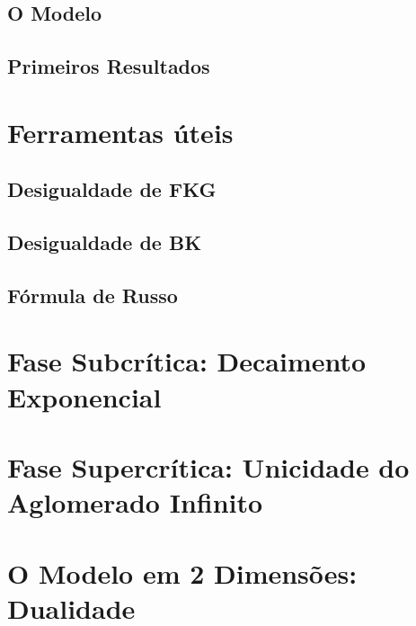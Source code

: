 \documentclass[12pt,a4paper]{book}
\begin{document}
\section{O Modelo}
\setcounter{equation}{0}
\label{sec:mod}


\section{Primeiros Resultados}
\setcounter{equation}{0}
\label{sec:res}


\chapter{Ferramentas úteis}
\setcounter{equation}{0}
\label{chp:fer}


\section{Desigualdade de FKG}
\setcounter{equation}{0}
\label{sec:fkg}


\section{Desigualdade de BK}
\setcounter{equation}{0}
\label{sec:bk}


\section{Fórmula de Russo}
\setcounter{equation}{0}
\label{sec:rus}


\chapter{Fase Subcrítica: Decaimento Exponencial}
\renewcommand{\theequation}{\thechapter .\arabic{equation}}
\pagestyle{myheadings}
\setcounter{equation}{0}
\label{chp:exp}


\chapter{Fase Supercrítica: Unicidade do Aglomerado Infinito}
\pagestyle{myheadings}
\setcounter{equation}{0}
\label{chp:uni}


\chapter{O Modelo em 2 Dimensões: Dualidade}
\pagestyle{myheadings}
\setcounter{equation}{0}
\label{chp:bid}

\end{document}
